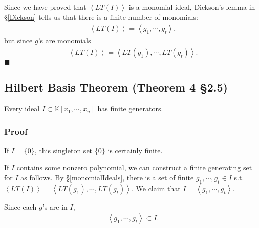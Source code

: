 \documentclass[11pt]{book}
\begin{document}
Since we have proved that $\left< LT(I) \right>$ is a monomial ideal, Dickson's lemma in \S\ref{Dickson} tells us that there is a finite number of monomials:
\begin{eqnarray}
\left< LT(I) \right> = \left< g_1, \cdots, g_t \right>,
\end{eqnarray}
but since $g$'s are monomials
\begin{eqnarray}
\left< LT(I) \right> = \left< LT(g_1), \cdots, LT(g_t) \right>.
\end{eqnarray}
$\blacksquare$

\subsection{Hilbert Basis Theorem (Theorem 4 \S2.5)}
\label{HilbertBasisTheorem}
Every ideal $I \subset \mathbb{K}[x_1, \cdots, x_{n}]$ has finite generators.

\subsubsection{Proof}
If $I = \{0\}$, this singleton set $\{0\}$ is certainly finite. %

If $I$ contains some nonzero polynomial, we can construct a finite generating set for $I$ as follows.
By \S\ref{monomialIdeals}, there is a set of finite $g_1, \cdots, g_t \in I$ s.t. $\left< LT(I) \right> = \left< LT(g_1), \cdots, LT(g_t) \right>$.
We claim that $I = \left< g_1, \cdots, g_t \right>$.

Since each $g$'s are in $I$, 
\begin{eqnarray}
\label{HilbertSubset}
\left< g_1, \cdots, g_t \right> \subset I.
\end{eqnarray}
\end{document}
